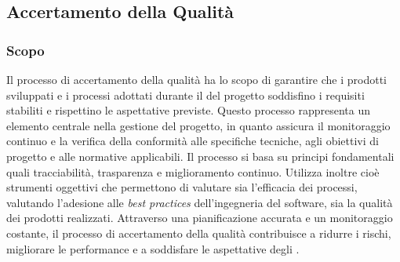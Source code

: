 \subsection{Accertamento della Qualità}
\label{subsec:accertamento_qualità}

\subsubsection{Scopo}
Il processo di accertamento della qualità ha lo scopo di garantire che i prodotti sviluppati e i processi adottati durante il  del progetto soddisfino i requisiti stabiliti e rispettino le aspettative previste.
Questo processo rappresenta un elemento centrale nella gestione del progetto, in quanto assicura il monitoraggio continuo e la verifica della conformità alle specifiche tecniche, agli obiettivi di progetto e alle normative applicabili.
Il processo si basa su principi fondamentali quali tracciabilità, trasparenza e miglioramento continuo.
Utilizza inoltre  cioè strumenti oggettivi che permettono di valutare sia l'efficacia dei processi, valutando l'adesione alle \textit{best practices} dell'ingegneria del software, sia la qualità dei prodotti realizzati.
Attraverso una pianificazione accurata e un monitoraggio costante, il processo di accertamento della qualità contribuisce a ridurre i rischi, migliorare le performance e a soddisfare le aspettative degli .

